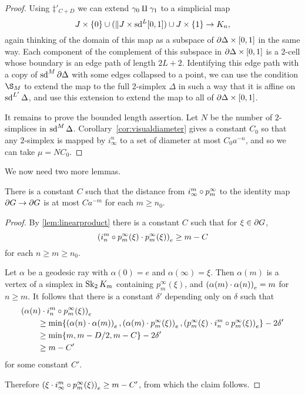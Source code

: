 \documentclass[a4paper]{article}
\begin{document}
\begin{proof}
  Using $\ddag'_{C+D}$ we can extend $\gamma_0\disjointunion\gamma_1$ to a simplicial map
  \begin{equation*}
    J\times\{0\} \union(\Vert J \times \sd^L [0,1]) \union J\times\{1\} \to K_n,
  \end{equation*}
  again thinking of the domain of this map as a subspace of
  $\boundary\Delta\times[0,1]$ in the same way. Each component of the
  complement of this subspace in $\boundary\Delta\times[0,1]$ is a $2$-cell
  whose boundary is an edge path of length $2L+2$. Identifying this edge path
  with a copy of $\sd^M\boundary\Delta$ with some edges collapsed to a point,
  we can use the condition $\S_M$ to extend the map to the full $2$-simplex
  $\Delta$ in such a way that it is affine on $\sd^{L'}\Delta$, and use this
  extension to extend the map to all of $\boundary\Delta\times[0,1]$.
  
  It remains to prove the bounded length assertion.  Let $N$ be the number of
  $2$-simplices in $\sd^M\Delta$.  Corollary~\ref{cor:visualdiameter} gives a
  constant $C_0$ so that any $2$-simplex is mapped by $i^n_\infty$ to a set of
  diameter at most $C_0 a^{-n}$, and so we can take $\mu = NC_0$.
\end{proof}

We now need two more lemmas.

\begin{lemma}\label{lem:convergestoidentity}
  There is a constant $C$ such that the distance from $i^m_\infty \composed 
  p^\infty_m$ to the identity map $\boundary G\to\boundary G$ is at most 
  $Ca^{-m}$ for each $m \geq n_0$.
\end{lemma}

\begin{proof}
  By \cref{lem:linearproduct} there is a constant $C$ such that  for $\xi \in
  \boundary G$,
  \begin{equation*}
    \gromov{e}{i^m_n\composed p^\infty_m(\xi)}{p^\infty_m(\xi)} \geq m - C
  \end{equation*} 
  for each $n\geq m\geq n_0$. 

  Let $\alpha$ be a geodesic ray with $\alpha(0) = e$ and $\alpha(\infty) = 
  \xi$. Then $\alpha(m)$ is a vertex of a simplex in $\Skel_2K_m$ containing 
  $p^\infty_m(\xi)$, and $\gromov{e}{\alpha(m)}{\alpha(n)} = m$ for $n\geq m$.
  It follows that there is a constant $\delta'$ depending only on $\delta$ such 
  that
  \begin{align*}
    \mathrlap{\gromov{e}{\alpha(n)}{i^m_n\composed p^\infty_m(\xi)}}\quad\quad &\\
          & \geq \min\{\gromov{e}{\alpha(n)}{\alpha(m)}, 
            \gromov{e}{\alpha(m)}{p^\infty_m(\xi)}, 
            \gromov{e}{p^\infty_m(\xi)}{i^m_n\composed p^\infty_m(\xi)}\} 
            - 2\delta' \\
          &\geq \min\{m, m - D/2, m - C\} - 2\delta' \\
          &\geq m - C'
  \end{align*}
  for some constant $C'$.

  Therefore $\gromov{e}{\xi}{i^m_\infty\composed p^\infty_m(\xi)} \geq m - C'$, 
  from which the claim follows.
\end{proof}
\end{document}
